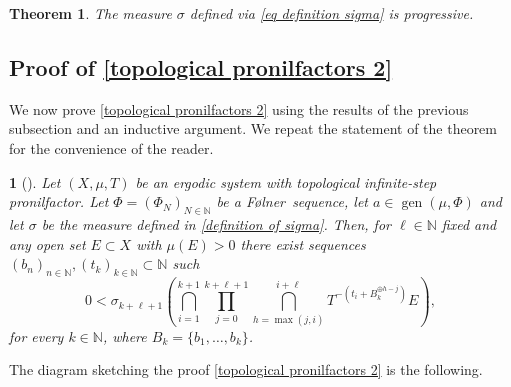 \documentclass[letter, 11pt]{article}
\makeatletter
\newcommand{\Folner}{F\o{}lner}
\newtheorem{theo}{Theorem}[section]
\theoremstyle{definition}
\theoremstyle{plain}
\newtheorem*{namedthm}{\namedthmname} %
\newenvironment{named}[2]{%
  \def\namedthmname{#1}%
  \begin{namedthm}[#2]%
  \def\@currentlabelname{#1}%
}{%
  \end{namedthm}%
}
\newcommand{\N}{\mathbb{N}}
\DeclareMathOperator\gen{gen}
\newcommand{\1}{\mathbbm{1}}
\makeatother
\begin{document}
\begin{theo}\label{progressive proof}
The measure $\sigma$ defined via \eqref{eq definition sigma} is 
progressive.   
\end{theo}
\subsection{Proof of \cref{topological pronilfactors 2}}

We   now prove \cref{topological pronilfactors 2} using the results 
of the previous subsection and an inductive argument. We repeat the 
statement of the theorem for the convenience of the reader.


\begin{named}{\cref{topological pronilfactors 2}}{}Let $(X,\mu,T)$ be an ergodic system with topological infinite-step 
pronilfactor. Let $\Phi=(\Phi_N)_{N\in \N}$ be a \Folner\ sequence, let 
$a\in \gen(\mu,\Phi)$ and let $\sigma$ be the measure defined in \cref{definition of sigma}. Then, for $\ell\in \N$ fixed and
any open set $E\subset X$ with $\mu(E)>0$ there exist 
sequences $(b_n)_{n\in \N}, (t_k)_{k\in \N}\subset \N$ such 
\begin{equation*}
       0<\sigma_{k+\ell+1}\left( \bigcap_{i=1}^{k+1}  \prod_{j=0}^{k+\ell+1}\bigcap_{h=\max(j,i)}^{i+\ell}  T^{-\left( t_i+ B_k^{\oplus h-j} \right)}  E   \right),  
   \end{equation*}
for every $k\in \N$, where $B_k=\{b_1,\ldots,b_{k}\}$.
\end{named}

The diagram sketching the proof \cref{topological pronilfactors 2} is the following.
\end{document}
